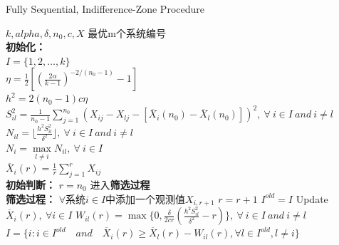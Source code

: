 \documentclass{article}
\begin{document}
\begin{algorithm}  
    \caption{Fully Sequential, Indifference-Zone Procedure}  
    \begin{algorithmic}[1] %
        \Require $k, alpha, \delta, n_0, c, X$ 
        \Ensure 最优m个系统编号\\


        \textbf{初始化：}\\
            $I = \{ 1,2, \dots, k\}$ \\
            $\eta = \frac{1}{2} [(\frac{2 \alpha}{k - 1})^{-2/(n_0-1)} - 1]$ \\
            $h^2 = 2 (n_0 - 1) c \eta $\\  
            $S _{il} ^{2} = \frac{1}{n_0 - 1} \sum \limits _{j=1} ^{n_0} 
            (X_{ij} - X_{lj} - [\overline{X} _i (n_0) - \overline{X} _l (n_0)]) ^2, 
            \  \forall \ i \in I \  and \  i \neq l $ \\
            $N_{il} = \lfloor \frac{h^2 S_{il}^2}{\delta ^2} \rfloor, 
            \  \forall \ i \in I \  and \  i \neq l $ \\
            $N_i = \max \limits _{l \neq i} N_{il}, \  \forall \ i \in I $ \\
            $\overline{X} _i (r) = \frac{1}{r} \sum _{j=1} ^{r} X_{ij}$\\
        \State
        \textbf{初始判断：}
                \State {} 
            \Else  
                \State $ r = n_0 $
                \State 进入\textbf{筛选过程}
            \EndIf  \\
        \State
        \textbf{筛选过程：}
                \State $\forall$系统$i \in I$中添加一个观测值$X_{i, r+1}$
                \State $r = r+1$
                    \State {}  
                \Else  
                    \State $ I^{old} = I $
                    \State Update $ \overline{X} _i (r), \  \forall i \in I$
                    \State $W _{il} (r) = \max \{ 0, \frac{\delta}{2cr} (\frac{h^2 S ^2 _{il}}{\delta ^2} - r)\}, \  \forall \ i \in I \  and \  i \neq l $
                    \State $ I = \{i : i \in I^{old} \quad and \quad \overline{X} _i (r) \geq \overline{X} _l (r) - W_{il} (r), \forall l \in I^{old}, l \neq i\} $
                \EndIf  
            \EndWhile  
            \State {}
    \end{algorithmic}  
\end{algorithm}  
\end{document}
